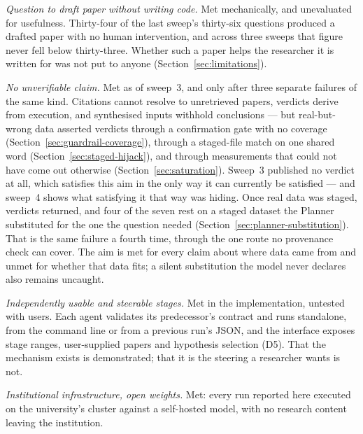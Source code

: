 \begin{description}[style=unboxed,leftmargin=0pt,itemsep=0.3em]
  \item[\textbf{A1}] \emph{Question to draft paper without writing code.} Met
    mechanically, and unevaluated for usefulness. Thirty-four of the last sweep's
    thirty-six questions produced a drafted paper with no human intervention, and
    across three sweeps that figure never fell below thirty-three. Whether such a
    paper helps the researcher it is written for was not put to anyone
    (Section~\ref{sec:limitations}).
  \item[\textbf{A2}] \emph{No unverifiable claim.} Met as of sweep~3, and only
    after three separate failures of the same kind. Citations cannot resolve to
    unretrieved papers, verdicts derive from execution, and synthesised inputs
    withhold conclusions --- but real-but-wrong data asserted verdicts through a
    confirmation gate with no coverage (Section~\ref{sec:guardrail-coverage}),
    through a staged-file match on one shared word
    (Section~\ref{sec:staged-hijack}), and through measurements that could not have
    come out otherwise (Section~\ref{sec:saturation}). Sweep~3 published no verdict
    at all, which satisfies this aim in the only way it can currently be satisfied
    --- and sweep~4 shows what satisfying it that way was hiding. Once real data was
    staged, verdicts returned, and four of the seven rest on a staged dataset the
    Planner substituted for the one the question needed
    (Section~\ref{sec:planner-substitution}). That is the same failure a fourth
    time, through the one route no provenance check can cover. The aim is met for
    every claim about where data came from and unmet for whether that data fits;
    a silent substitution the model never declares also remains uncaught.
  \item[\textbf{A3}] \emph{Independently usable and steerable stages.} Met in the
    implementation, untested with users. Each agent validates its predecessor's
    contract and runs standalone, from the command line or from a previous run's
    JSON, and the interface exposes stage ranges, user-supplied papers and
    hypothesis selection (D5). That the mechanism exists is demonstrated; that it is
    the steering a researcher wants is not.
  \item[\textbf{A4}] \emph{Institutional infrastructure, open weights.} Met: every
    run reported here executed on the university's cluster against a self-hosted
    model, with no research content leaving the institution.

\end{description}
